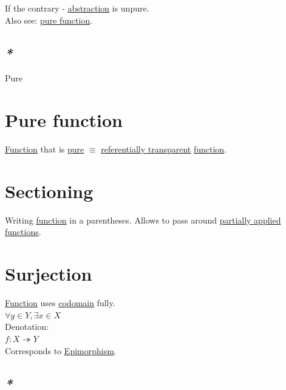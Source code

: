 \documentclass[a4paper,14pt,oneside]{book}
\begin{document}
If the contrary - \hyperref[orgb4a6914]{abstraction} is unpure.\\

Also see: \hyperref[orgadffffa]{pure function}.\\

\subsection{\emph{*}}
\label{sec:org3a7dc72}

\label{orgbb61cf1}Pure\\

\section{\label{orgadffffa}Pure function}
\label{sec:org96077a5}

\hyperref[org8cc2ae4]{Function} that is \hyperref[orgbb61cf1]{pure} \(\equiv\) \hyperref[org5257b08]{referentially transparent} \hyperref[org8cc2ae4]{function}.\\

\section{\label{orgb3f3a84}Sectioning}
\label{sec:org9382bcd}
Writing \hyperref[org8cc2ae4]{function} in a parentheses. Allows to pass around \hyperref[org231ab20]{partially applied} \hyperref[org0bd6046]{functions}.\\

\section{\label{org1f7dafa}Surjection}
\label{sec:org7c1d650}
\hyperref[org8cc2ae4]{Function} uses \hyperref[org71c95ef]{codomain} fully.\\

\(\forall y \in Y, \exists x \in X\)\\

Denotation:\\
\(f : X \twoheadrightarrow Y\)\\

Corresponds to \hyperref[orgf6e99e9]{Epimorphism}.\\

\subsection{\emph{*}}
\label{sec:orga694a55}
\end{document}
